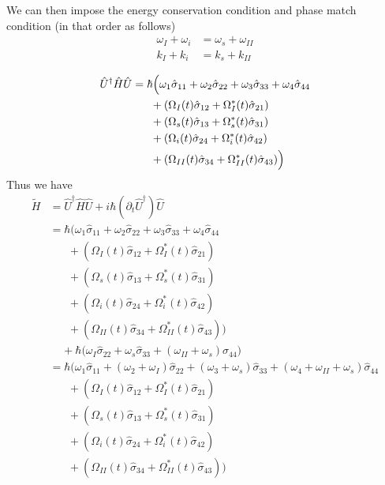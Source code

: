 \documentclass[aps,pra,showpacs,amsmath,amssymb,nofootinbib,longbibliography,superscriptaddress
]{revtex4-1}
\theoremstyle{definition}
\theoremstyle{remark}
\newcommand{\0}{\hat{0}}
\begin{document}
We can then impose the energy conservation condition and phase match condition (in that order as follows)
\begin{align}
    \omega_I + \omega_i &= \omega_s + \omega_{II}\\
    k_I + k_i &= k_s + k_{II}
\end{align}

\begin{align}
    \hat{U}^{\dagger} \hat{H} \hat{U}
    &= \hbar \Bigl(\omega_1 \hat{\sigma}_{11} + \omega_2 \hat{\sigma}_{22} + \omega_3 \hat{\sigma}_{33} + \omega_4 \hat{\sigma}_{44} \nonumber \\
    &\;\;\;\;\;\;+ \left(\Omega_{I}(t) \hat{\sigma}_{12} + \Omega_{I}^*(t) \hat{\sigma}_{21} \right)\nonumber \\
    &\;\;\;\;\;\;+ \left(\Omega_{s}(t) \hat{\sigma}_{13} + \Omega_{s}^*(t) \hat{\sigma}_{31} \right)\nonumber \\
    &\;\;\;\;\;\;+ (\Omega_{i}(t) \hat{\sigma}_{24} + \Omega_{i}^*(t) \hat{\sigma}_{42} )\nonumber \\
    &\;\;\;\;\;\;+ (\Omega_{II}(t) \hat{\sigma}_{34} + \Omega_{II}^*(t) \hat{\sigma}_{43} )\Bigr)
\end{align}
Thus we have
\begin{align}
    \tilde{H} &= \hat{U}^{\dagger} \hat{H} \hat{U} + i \hbar (\partial_t \hat{U}^{\dagger}) \hat{U} \nonumber \\
    &= \hbar \biggl(\omega_1 \hat{\sigma}_{11} + \omega_2 \hat{\sigma}_{22} + \omega_3 \hat{\sigma}_{33} + \omega_4 \hat{\sigma}_{44} \nonumber \\
    &\;\;\;\;\;\;+ \left(\Omega_{I}(t) \hat{\sigma}_{12} + \Omega_{I}^*(t) \hat{\sigma}_{21} \right)\nonumber \\
    &\;\;\;\;\;\;+ \left(\Omega_{s}(t) \hat{\sigma}_{13} + \Omega_{s}^*(t) \hat{\sigma}_{31} \right) \nonumber \\
    &\;\;\;\;\;\;+ ( \Omega_{i}(t) \hat{\sigma}_{24} + \Omega_{i}^*(t) \hat{\sigma}_{42} ) \nonumber \\
    &\;\;\;\;\;\;+ (\Omega_{II}(t) \hat{\sigma}_{34} + \Omega_{II}^*(t) \hat{\sigma}_{43} )\biggr)\nonumber \\
    &\;\;\;\;+ \hbar \biggl(\omega_I \hat{\sigma}_{22} + \omega_s \hat{\sigma}_{33} + (\omega_{II} + \omega_s) \hat{\sigma}_{44} \biggr) \nonumber \\
    &= \hbar \biggl(\omega_1 \hat{\sigma}_{11} + (\omega_2 + \omega_I) \hat{\sigma}_{22} + (\omega_3 + \omega_s) \hat{\sigma}_{33} + (\omega_4 + \omega_{II} + \omega_s) \hat{\sigma}_{44} \nonumber \\
    &\;\;\;\;\;\;+ \left(\Omega_{I}(t) \hat{\sigma}_{12} + \Omega_{I}^*(t) \hat{\sigma}_{21} \right)\nonumber \\
    &\;\;\;\;\;\;+ \left(\Omega_{s}(t) \hat{\sigma}_{13} + \Omega_{s}^*(t) \hat{\sigma}_{31} \right) \nonumber \\
    &\;\;\;\;\;\;+ (\Omega_{i}(t) \hat{\sigma}_{24} + \Omega_{i}^*(t) \hat{\sigma}_{42} ) \nonumber \\
    &\;\;\;\;\;\;+ (\Omega_{II}(t) \hat{\sigma}_{34} + \Omega_{II}^*(t) \hat{\sigma}_{43} )\biggr)\nonumber
\end{align}
\end{document}
